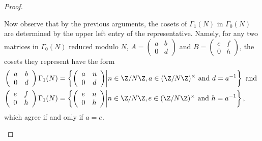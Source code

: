 \documentclass[10pt]{amsart}
\begin{document}
\begin{thm}
\begin{proof}
\begin{enumerate}[(a)]
      Now observe that by the previous arguments, the cosets of $\Gamma_1(N)$ in $\Gamma_0(N)$ are determined by the upper left entry of the representative.  Namely,
      for any two matrices in $\Gamma_0(N)$ reduced modulo $N$, $A = \left(
      \begin{array}{cc}
	a & b\\
	0 & d
      \end{array}\right)$ and $B = \left(
      \begin{array}{cc}
	e & f\\
	0 & h
      \end{array}\right)$, the cosets they represent have the form
      \begin{align*}
      \left(
      \begin{array}{cc}
	a & b\\
	0 & d
      \end{array}\right)\Gamma_1(N) &= \left\{
      \left(
      \begin{array}{cc}
	a & n\\
	0 & d
      \end{array}\right) \middle\vert n \in \Z/N\Z, a \in (\Z/N\Z)^{\times} \text{ and } d = a^{-1} \right\} \text{ and } \\
      \left(
      \begin{array}{cc}
	e & f\\
	0 & h
      \end{array}\right)\Gamma_1(N) &= \left\{\left(
      \begin{array}{cc}
	e & n\\
	0 & h
      \end{array}\right) \middle\vert n \in \Z/N\Z, e \in (\Z/N\Z)^{\times} \text{ and } h = a^{-1} \right\},
      \end{align*}
      which agree if and only if $a = e$.

\end{enumerate}
\end{proof}
\end{thm}
\end{document}
